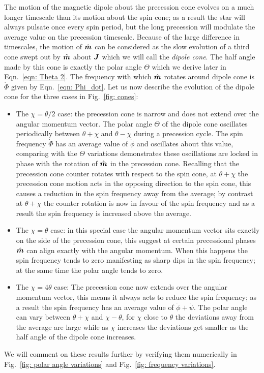 \documentclass[../full_thesis/full_thesis.tex]{subfiles}
\begin{document}
The motion of the magnetic dipole about the precession cone evolves on a much
longer timescale than its motion about the spin cone; as a result the star will
always pulsate once every spin period, but the long precession will modulate
the average value on the precession timescale. Because of the large difference
in timescales, the motion of $\hat{\boldsymbol{m}}$ can be considered as the slow evolution of a
third cone swept out by $\hat{\boldsymbol{m}}$ about $\boldsymbol{J}$ which we will call the \emph{dipole cone}. The
half angle made by this cone is exactly the polar angle $\Theta$ which we derive
later in Eqn.~\eqref{eqn: Theta 2}. The frequency with which $\hat{\boldsymbol{m}}$ rotates around
dipole cone is $\dot{\Phi}$ given by Eqn.~\eqref{eqn: Phi_dot}. Let us now
describe the evolution of the dipole cone for the three cases in Fig.~\ref{fig: cones}:
\begin{itemize}
\item The $\chi = \theta/2$ case: the precession cone is narrow and does not
extend over the angular momentum vector. The polar angle $\Theta$ of the dipole
cone oscillates periodically between $\theta+\chi$ and $\theta-\chi$
during a precession cycle. The spin frequency $\dot{\Phi}$ has an average value
of $\dot{\phi}$ and
oscillates about this value, comparing with the $\Theta$ variations
demonstrates these oscillations are locked in phase with the rotation of $\hat{\boldsymbol{m}}$
in the precession cone. Recalling that the precession cone counter rotates with
respect to the spin cone, at $\theta+\chi$ the precession cone motion acts in
the opposing direction to the spin cone, this causes a reduction in the spin
frequency away from the average; by contrast at $\theta+\chi$ the counter
rotation is now in favour of the spin frequency and as a result the spin
frequency is increased above the average.

\item The $\chi = \theta$ case: in this special case the angular momentum vector sits exactly
on the side of the precession cone, this suggest at certain precessional phases $\hat{\boldsymbol{m}}$ can align exactly with
the angular momentum. When this happens the spin frequency tends to zero manifesting as sharp dips in the
spin frequency; at the same time the polar angle tends to zero.

\item The $\chi = 4\theta$ case: The precession cone now extends over the
angular momentum vector, this means it always acts to reduce the spin
frequency; as a result the spin frequency has an average value of
$\dot{\phi} + \dot{\psi}$. The polar angle can vary between $\theta+\chi$ and
$\chi-\theta$, for $\chi$ close to $\theta$ the deviations away from the
average are large while as $\chi$ increases the deviations get smaller as
the half angle of the dipole cone increases.
\end{itemize}
We will comment on these results further by verifying them numerically in
Fig.~\ref{fig: polar angle variations} and Fig.~\ref{fig: frequency variations}. 
\end{document}
